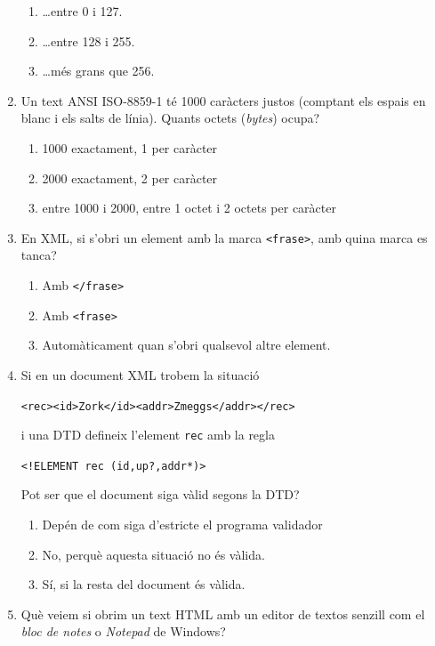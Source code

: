 \begin{enumerate}
\begin{enumerate}
\item {\ldots}entre 0 i 127.
\item {\ldots}entre 128 i 255.
\item {\ldots}més grans que 256.
\end{enumerate}
\item Un text ANSI ISO-8859-1 té 1000 caràcters justos (comptant
   els espais en blanc i els salts de línia). Quants octets
   (\emph{bytes}) ocupa?
   
\begin{enumerate}
\item 1000 exactament, 1 per caràcter
\item 2000 exactament, 2 per caràcter
\item entre 1000 i 2000, entre 1 octet i 2 octets per caràcter
\end{enumerate}
\item En XML, si s'obri un element amb la marca
   \verb|<frase>|, amb quina marca es tanca?
   
\begin{enumerate}
\item Amb \verb|</frase>|
\item Amb \verb|<frase>|
\item Automàticament quan s'obri qualsevol altre element.
\end{enumerate}
\item   
   Si en un document XML trobem la situació
   \begin{center}\verb|<rec><id>Zork</id><addr>Zmeggs</addr></rec>|\end{center}   i una DTD defineix l'element \verb|rec| amb la regla
   \begin{center}\verb|<!ELEMENT rec (id,up?,addr*)>|\end{center} Pot
   ser que el document siga vàlid segons la DTD?
   
\begin{enumerate}
\item Depén de com siga d'estricte el programa validador
\item No, perquè aquesta situació no és vàlida.
\item Sí, si la resta del document és vàlida.
\end{enumerate}

\item 
   Què veiem si obrim un text HTML amb un editor de textos senzill com
   el \emph{bloc de notes} o \emph{Notepad} de Windows?
   

\end{enumerate}
